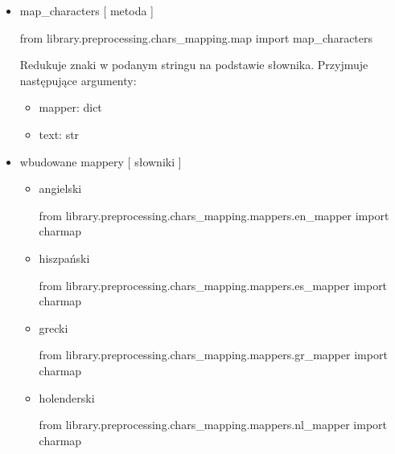 \myspace
{}
\myspace

\begin{itemize}

\item{map\_characters [ metoda ] }
\begin{import}
from library.preprocessing.chars_mapping.map import map_characters
\end{import}

Redukuje znaki w podanym stringu na podstawie słownika. 
Przyjmuje następujące argumenty:
\begin{itemize}
	\item mapper: dict
	\item text: str
\end{itemize}


\item{wbudowane mappery [ słowniki ] }

\begin{itemize} 

\item angielski
\begin{import}
from library.preprocessing.chars_mapping.mappers.en_mapper import charmap
\end{import}


\item hiszpański
\begin{import}
from library.preprocessing.chars_mapping.mappers.es_mapper import charmap
\end{import}


\item grecki
\begin{import}
from library.preprocessing.chars_mapping.mappers.gr_mapper import charmap
\end{import}


\item holenderski
\begin{import}
from library.preprocessing.chars_mapping.mappers.nl_mapper import charmap
\end{import}

\end{itemize}

\end{itemize}


